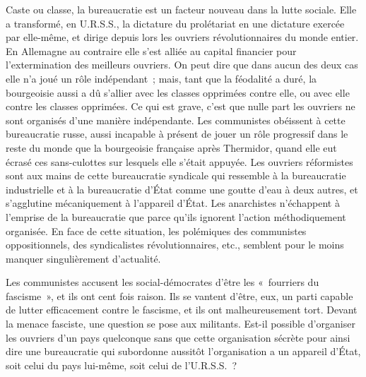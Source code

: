 \documentclass[french,twoside]{book} %
\begin{document}
\noindent Caste ou classe, la bureaucratie est un facteur nouveau dans la lutte sociale. Elle a transformé, en U.R.S.S., la dictature du prolétariat en une dictature exercée par elle-même, et dirige depuis lors les ouvriers révolutionnaires du monde entier. En Allemagne au contraire elle s'est alliée au capital financier pour l'extermination des meilleurs ouvriers. On peut dire que dans aucun des deux cas elle n'a joué un rôle indépendant ; mais, tant que la féodalité a duré, la bourgeoisie aussi a dû s'allier avec les classes opprimées contre elle, ou avec elle contre les classes opprimées. Ce qui est grave, c'est que nulle part les ouvriers ne sont organisés d'une manière indépendante. Les communistes obéissent à cette bureaucratie russe, aussi incapable à présent de jouer un rôle progressif dans le reste du monde que la bourgeoisie française après Thermidor, quand elle eut écrasé ces sans-culottes sur lesquels elle s'était appuyée. Les ouvriers réformistes sont aux mains de cette bureaucratie syndicale qui ressemble à la bureaucratie industrielle et à la bureaucratie d'État comme une goutte d'eau à deux autres, et s'agglutine mécaniquement à l'appareil d'État. Les anarchistes n'échappent à l'emprise de la bureaucratie que parce qu'ils ignorent l'action méthodiquement organisée. En face de cette situation, les polémiques des communistes oppositionnels, des syndicalistes révolutionnaires, etc., semblent pour le moins manquer singulièrement d'actualité.\par
Les communistes accusent les social-démocrates d'être les « fourriers du fascisme », et ils ont cent fois raison. Ils se vantent d'être, eux, un parti capable de lutter efficacement contre le fascisme, et ils ont malheureusement tort. Devant la menace fasciste, une question se pose aux militants. Est-il possible d'organiser les ouvriers d'un pays quelconque sans que cette organisation sécrète pour ainsi dire une bureaucratie qui subordonne aussitôt l'organisation a un appareil d'État, soit celui du pays lui-même, soit celui de l'U.R.S.S. ?\par
\end{document}
